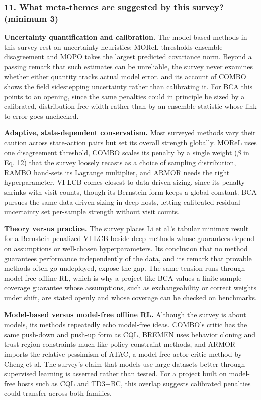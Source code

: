 \documentclass[11pt]{article}
\newcommand{\question}[1]{\subsubsection*{#1}}
\begin{document}
\question{11. What meta-themes are suggested by this survey? (minimum 3)}

\textbf{Uncertainty quantification and calibration.} The model-based methods in this survey rest on uncertainty heuristics: MOReL thresholds ensemble disagreement and MOPO takes the largest predicted covariance norm. Beyond a passing remark that such estimates can be unreliable, the survey never examines whether either quantity tracks actual model error, and its account of COMBO shows the field sidestepping uncertainty rather than calibrating it. For BCA this points to an opening, since the same penalties could in principle be sized by a calibrated, distribution-free width rather than by an ensemble statistic whose link to error goes unchecked.

\textbf{Adaptive, state-dependent conservatism.} Most surveyed methods vary their caution across state-action pairs but set its overall strength globally. MOReL uses one disagreement threshold, COMBO scales its penalty by a single weight (\ensuremath{\beta} in Eq. 12) that the survey loosely recasts as a choice of sampling distribution, RAMBO hand-sets its Lagrange multiplier, and ARMOR needs the right hyperparameter. VI-LCB comes closest to data-driven sizing, since its penalty shrinks with visit counts, though its Bernstein form keeps a global constant. BCA pursues the same data-driven sizing in deep hosts, letting calibrated residual uncertainty set per-sample strength without visit counts.

\textbf{Theory versus practice.} The survey places Li et al.'s tabular minimax result for a Bernstein-penalized VI-LCB beside deep methods whose guarantees depend on assumptions or well-chosen hyperparameters. Its conclusion that no method guarantees performance independently of the data, and its remark that provable methods often go undeployed, expose the gap. The same tension runs through model-free offline RL, which is why a project like BCA values a finite-sample coverage guarantee whose assumptions, such as exchangeability or correct weights under shift, are stated openly and whose coverage can be checked on benchmarks.

\textbf{Model-based versus model-free offline RL.} Although the survey is about models, its methods repeatedly echo model-free ideas. COMBO's critic has the same push-down and push-up form as CQL, BREMEN uses behavior cloning and trust-region constraints much like policy-constraint methods, and ARMOR imports the relative pessimism of ATAC, a model-free actor-critic method by Cheng et al. The survey's claim that models use large datasets better through supervised learning is asserted rather than tested. For a project built on model-free hosts such as CQL and TD3+BC, this overlap suggests calibrated penalties could transfer across both families.
\end{document}
